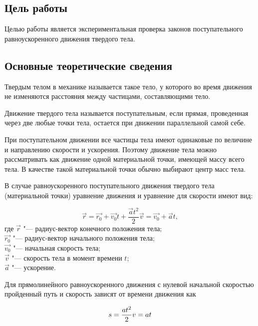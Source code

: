 \documentclass[a4paper, 12pt]{extarticle}
\begin{document}
\MTDTitlePage
\MTDInfoPage

\setcounter{section}{2}

\subsection{Цель работы}
Целью работы является экспериментальная проверка законов поступательного равноускоренного движения твердого тела. 

\subsection{Основные теоретические сведения}
Твердым телом в механике называется такое тело, у которого во время движения не изменяются расстояния между частицами, составляющими тело. 

Движение твердого тела называется поступательным, если прямая, проведенная через две любые точки тела, остается при движении параллельной самой себе.

При поступательном движении все частицы тела имеют одинаковые по величине и направлению скорости и ускорения. Поэтому движение тела можно рассматривать как движение одной материальной точки, имеющей массу всего тела. В качестве такой материальной точки обычно выбирают центр масс тела. 

В случае равноускоренного поступательного движения твердого тела (материальной точки) уравнение движения и уравнение для скорости имеют вид:

\begin{equation}
\label{eq:m2-uni-acc-motion}
\vec{r} = \vec{r_0} + \vec{v_0}t + \frac{\vec{a}t^2}{2} %
\vec{v} = \vec{v_0} + \vec{a}t,
\end{equation}
где $\vec{r}$ "--- радиус-вектор конечного положения тела; \\%
$\vec{r_0}$ "--- радиус-вектор начального положения тела; \\
$\vec{v_0}$ "--- начальная скорость тела; \\
$\vec{v}$ "--- скорость тела в момент времени $t$; \\
$\vec{a}$ "--- ускорение. 

Для прямолинейного равноускоренного движения с нулевой начальной скоростью пройденный путь и скорость зависят от времени движения как %

\begin{equation}
\label{eq:m2-uni-acc-lin-motion}
s = \frac{at^2}{2} \\
v = at 
\end{equation}
\end{document}
